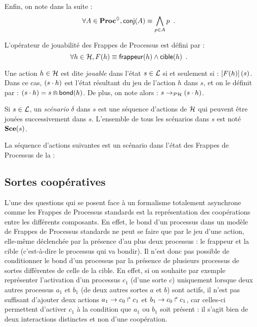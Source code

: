 Enfin, on note dans la suite :
\[\forall A \in \mathbf{Proc}^{\lozenge}, \mathsf{conj}(A) \equiv \bigwedge_{p \in A} p \enspace.\]


\begin{definition}
  L'opérateur de jouabilité des Frappes de Processus est défini par :
  \[\forall h \in \mathcal{H}, F(h) \equiv \mathsf{frappeur}(h) \wedge \mathsf{cible}(h) \enspace.\]
\end{definition}

\begin{definition}
  Une action $h \in \mathcal{H}$ est dite \emph{jouable}
  dans l'état $s \in \mathcal{L}$ si et seulement si :
  $\left[F(h)\right](s)$.
  Dans ce cas, $(s \cdot h)$ est l'état résultant du jeu de l'action $h$ dans $s$,
  et on le définit par : $(s \cdot h) = s \Cap \mathsf{bond}(h)$.
  De plus, on note alors : $s \rightarrow_{\mathcal{PH}} (s \cdot h)$.

  Si $s \in \mathcal{L}$, un \emph{scénario} $\delta$ dans $s$
  est une séquence d'actions de $\mathcal{H}$ qui peuvent être jouées successivement dans $s$.
  L'ensemble de tous les scénarios dans $s$ est noté $\mathbf{Sce}(s)$.
\end{definition}

\begin{example}
  La séquence d'actions suivantes est un scénario dans l'état \TODO des Frappes de Processus
  de la  :
  \TODO
\end{example}



\subsection{Sortes coopératives}

L'une des questions qui se posent face à un formalisme totalement asynchrone comme
les Frappes de Processus standards est la représentation des coopérations entre les différents
composants.
En effet, le bond d'un processus dans un modèle de Frappes de Processus standards
ne peut se faire que par le jeu d'une action,
elle-même déclenchée par la présence d'au plus deux processus :
le frappeur et la cible (c'est-à-dire le processus qui va bondir).
Il n'est donc pas possible de conditionner le bond d'un processus par la présence
de plusieurs processus de sortes différentes de celle de la cible.
En effet,
si on souhaite par exemple représenter l'activation d'un processus $c_1$ (d'une sorte $c$)
uniquement lorsque deux autres processus $a_1$ et $b_1$ (de deux autres sortes $a$ et $b$)
sont actifs, il n'est pas suffisant d'ajouter deux actions
$a_1\rightarrow c_0\Rsh c_1$ et $b_1\rightarrow c_0\Rsh c_1$,
car celles-ci permettent d'activer $c_1$ à la condition que $a_1$ ou $b_1$
soit présent : il s'agit bien de deux interactions distinctes et non d'une coopération.

